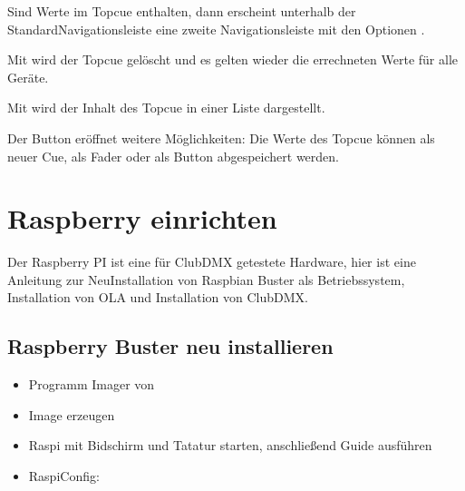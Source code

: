 \documentclass[letterpaper,10pt,ngerman]{sphinxmanual}
\begin{document}
\noindent{}

Sind Werte im Topcue enthalten, dann erscheint unterhalb der
Standard\sphinxhyphen{}Navigationsleiste
eine zweite Navigationsleiste mit den Optionen .

Mit  wird der Topcue gelöscht und es gelten wieder die errechneten Werte
für alle Geräte.

Mit  wird der Inhalt des Topcue in einer Liste dargestellt.

Der Button  eröffnet weitere Möglichkeiten: Die Werte des Topcue
können als neuer Cue, als Fader oder als Button abgespeichert werden.

\noindent{}


\chapter{Raspberry einrichten}
\label{\detokenize{raspberry:raspberry-einrichten}}\label{\detokenize{raspberry:raspberry-label}}\label{\detokenize{raspberry::doc}}
Der Raspberry PI ist eine für ClubDMX getestete Hardware, hier ist
eine Anleitung zur Neu\sphinxhyphen{}Installation von Raspbian Buster als Betriebssystem,
Installation von OLA und Installation von ClubDMX.


\section{Raspberry Buster neu installieren}
\label{\detokenize{raspberry:raspberry-buster-neu-installieren}}\label{\detokenize{raspberry:buster}}\begin{itemize}
\item {} 
Programm Imager von 

\item {} 
Image erzeugen

\item {} 
Raspi mit Bidschirm und Tatatur starten, anschließend Guide ausführen

\item {} 
Raspi\sphinxhyphen{}Config:

\end{itemize}
\end{document}
